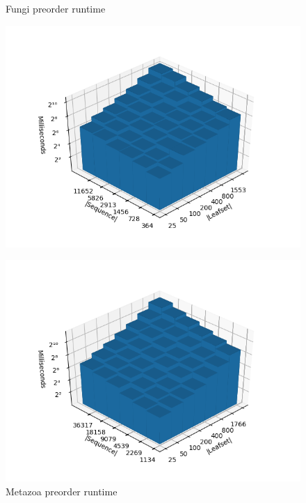 \documentclass[11pt]{article}
\begin{document}
\begin{figure}[h]
\centering
\begin{minipage}{0.49\textwidth}
\centering
\caption{Fungi preorder runtime}
\label{Fig:Fungi}
\includegraphics[width=1.05\textwidth]{fungi-preorder.png}
\end{minipage}
\hfill
\begin{minipage}{0.49\textwidth}
\centering
\caption{Metazoa preorder runtime}
\label{Fig:Metazoa}
\includegraphics[width=1.05\textwidth]{metazoa-preorder.png}
\end{minipage}


\end{figure}
\end{document}
